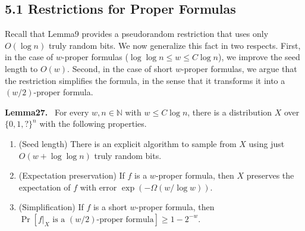 \documentclass[10pt,a4paper]{article}
\newenvironment{authorclaim}[1]{\par\medskip\noindent\textbf{#1.}\ \ignorespaces}{\par\medskip}
\begin{document}
\subsection*{5.1 Restrictions for Proper Formulas}
Recall that Lemma9 provides a pseudorandom restriction that uses only $O(\log n)$ truly random bits. We now generalize this fact in two respects. First, in the case of $w$-proper formulas ($\log\log n\le w\le C\log n$), we improve the seed length to $O(w)$. Second, in the case of short $w$-proper formulas, we argue that the restriction simplifies the formula, in the sense that it transforms it into a $(w/2)$-proper formula.
\begin{authorclaim}{Lemma27}
For every $w,n\in\mathbb N$ with $w\le C\log n$, there is a distribution $X$ over $\{0,1,?\}^n$ with the following properties.
\begin{enumerate}
\item (Seed length) There is an explicit algorithm to sample from $X$ using just $O(w+\log\log n)$ truly random bits.
\item (Expectation preservation) If $f$ is a $w$-proper formula, then $X$ preserves the expectation of $f$ with error $\exp(-\Omega(w/\log w))$.
\item (Simplification) If $f$ is a short $w$-proper formula, then $\Pr[f|_X\text{ is a }(w/2)\text{-proper formula}]\ge1-2^{-w}$.
\end{enumerate}
\end{authorclaim}
\end{document}
